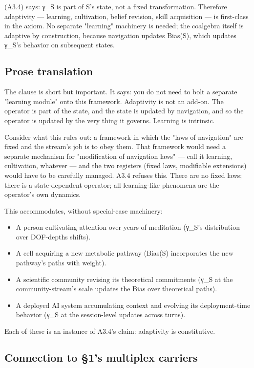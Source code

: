 \documentclass[11pt, openany]{book}
\begin{document}
(A3.4) says: γ\_\allowbreak{}S is part of S's state, not a fixed transformation. Therefore adaptivity --- learning, cultivation, belief revision, skill acquisition --- is first-class in the axiom. No separate "learning" machinery is needed; the coalgebra itself is adaptive by construction, because navigation updates Bias(S), which updates γ\_\allowbreak{}S's behavior on subsequent states.

\subsection{Prose translation}

The clause is short but important. It says: you do not need to bolt a separate "learning module" onto this framework. Adaptivity is not an add-on. The operator is part of the state, and the state is updated by navigation, and so the operator is updated by the very thing it governs. Learning is intrinsic.

Consider what this rules out: a framework in which the "laws of navigation" are fixed and the stream's job is to obey them. That framework would need a separate mechanism for "modification of navigation laws" --- call it learning, cultivation, whatever --- and the two registers (fixed laws, modifiable extensions) would have to be carefully managed. A3.4 refuses this. There are no fixed laws; there is a state-dependent operator; all learning-like phenomena are the operator's own dynamics.

This accommodates, without special-case machinery:
\begin{itemize}
\item A person cultivating attention over years of meditation (γ\_\allowbreak{}S's distribution over DOF-depths shifts).
\item A cell acquiring a new metabolic pathway (Bias(S) incorporates the new pathway's paths with weight).
\item A scientific community revising its theoretical commitments (γ\_\allowbreak{}S at the community-stream's scale updates the Bias over theoretical paths).
\item A deployed AI system accumulating context and evolving its deployment-time behavior (γ\_\allowbreak{}S at the session-level updates across turns).
\end{itemize}

Each of these is an instance of A3.4's claim: adaptivity is constitutive.

\subsection{Connection to §1's multiplex carriers}
\end{document}
